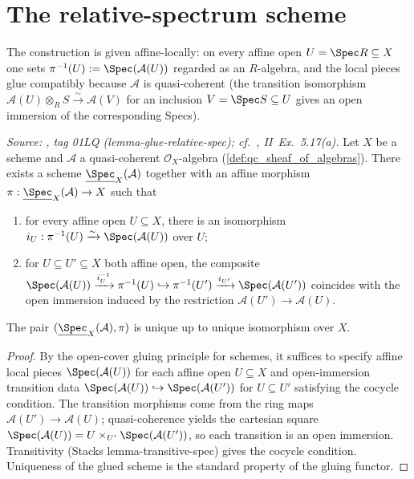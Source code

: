 \section{The relative-spectrum scheme}
\label{sec:relspec_scheme}

The construction is given affine-locally: on every affine open \(U = \Spec R \subseteq X\) one
sets \(\pi^{-1}(U) := \Spec(\mathcal{A}(U))\) regarded as an \(R\)-algebra, and the local pieces
glue compatibly because \(\mathcal{A}\) is quasi-coherent (the transition isomorphism
\(\mathcal{A}(U) \otimes_R S \xrightarrow{\sim} \mathcal{A}(V)\) for an inclusion
\(V = \Spec S \subseteq U\) gives an open immersion of the corresponding Specs).

\begin{theorem}
  \label{thm:relative_spec_exists}
  \textit{Source: \cite{stacks-project}, tag 01LQ (lemma-glue-relative-spec);
  cf.\ \cite{hartshorne-ag}, II~Ex.~5.17(a).}
  Let \(X\) be a scheme and \(\mathcal{A}\) a quasi-coherent \(\mathcal{O}_X\)-algebra
  (\cref{def:qc_sheaf_of_algebras}). There exists a scheme
  \(\underline{\Spec}_X(\mathcal{A})\) together with an affine morphism
  \(\pi : \underline{\Spec}_X(\mathcal{A}) \to X\) such that
  \begin{enumerate}
    \item for every affine open \(U \subseteq X\), there is an isomorphism
      \(i_U : \pi^{-1}(U) \xrightarrow{\sim} \Spec(\mathcal{A}(U))\) over \(U\);
    \item for \(U \subseteq U' \subseteq X\) both affine open, the composite
      $\Spec(\mathcal{A}(U)) \xrightarrow{i_U^{-1}} \pi^{-1}(U) \hookrightarrow
      \pi^{-1}(U') \xrightarrow{i_{U'}} \Spec(\mathcal{A}(U'))$
      coincides with the open immersion induced by the restriction
      \(\mathcal{A}(U') \to \mathcal{A}(U)\).
  \end{enumerate}
  The pair \((\underline{\Spec}_X(\mathcal{A}), \pi)\) is unique up to unique isomorphism
  over \(X\).
\end{theorem}

\begin{proof}
  By the open-cover gluing principle for schemes, it suffices to specify affine local
  pieces \(\Spec(\mathcal{A}(U))\) for each affine open \(U \subseteq X\) and
  open-immersion transition data
  \(\Spec(\mathcal{A}(U)) \hookrightarrow \Spec(\mathcal{A}(U'))\) for \(U \subseteq U'\)
  satisfying the cocycle condition. The transition morphisms come from the ring maps
  \(\mathcal{A}(U') \to \mathcal{A}(U)\); quasi-coherence yields the cartesian square
  \(\Spec(\mathcal{A}(U)) = U \times_{U'} \Spec(\mathcal{A}(U'))\), so each transition is an
  open immersion. Transitivity (Stacks lemma-transitive-spec) gives the cocycle condition.
  Uniqueness of the glued scheme is the standard property of the gluing functor.
\end{proof}

